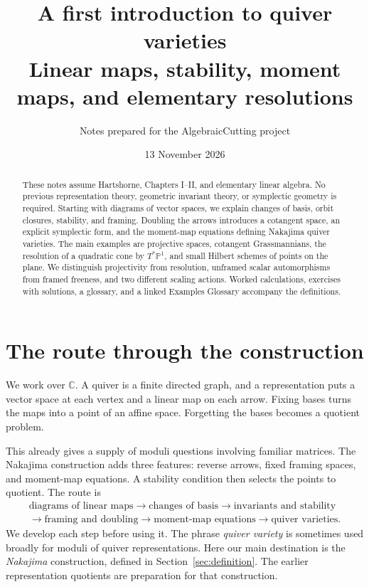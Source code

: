 \documentclass[11pt,a4paper]{article}
\title{A first introduction to quiver varieties\\[5pt]
\large Linear maps, stability, moment maps, and elementary resolutions}
\author{Notes prepared for the AlgebraicCutting project}
\date{13 November 2026}
\numberwithin{equation}{section}
\theoremstyle{definition}
\newcommand{\PP}{\mathbb P}
\begin{document}
\maketitle
\begin{abstract}
These notes assume Hartshorne, Chapters I--II, and elementary linear
algebra. No previous representation theory, geometric invariant theory,
or symplectic geometry is required. Starting with diagrams of vector
spaces, we explain changes of basis, orbit closures, stability, and
framing. Doubling the arrows introduces a cotangent space, an explicit
symplectic form, and the moment-map equations defining Nakajima quiver
varieties. The main examples are projective spaces, cotangent
Grassmannians, the resolution of a quadratic cone by $T^*\PP^1$, and
small Hilbert schemes of points on the plane. We distinguish projectivity
from resolution, unframed scalar automorphisms from framed freeness,
and two different scaling actions. Worked calculations, exercises with
solutions, a glossary, and a linked Examples Glossary accompany the
definitions.
\end{abstract}
\tableofcontents
\newpage

\section{The route through the construction}
\label{sec:roadmap}

We work over $\mathbb C$. A quiver is a finite directed graph, and a
representation puts a vector space at each vertex and a linear map on
each arrow. Fixing bases turns the maps into a point of an affine
space. Forgetting the bases becomes a quotient problem.

This already gives a supply of moduli questions involving familiar
matrices. The Nakajima construction adds three features: reverse
arrows, fixed framing spaces, and moment-map equations. A stability
condition then selects the points to quotient. The route is
\[
\begin{gathered}
\text{diagrams of linear maps}\longrightarrow\text{changes of basis}
\longrightarrow\text{invariants and stability}\\
\longrightarrow\text{framing and doubling}\longrightarrow
\text{moment-map equations}\longrightarrow\text{quiver varieties}.
\end{gathered}
\]
We develop each step before using it. The phrase \emph{quiver variety}
is sometimes used broadly for moduli of quiver representations. Here
our main destination is the \emph{Nakajima} construction, defined in
Section~\ref{sec:definition}. The earlier representation quotients
are preparation for that construction.
\end{document}
